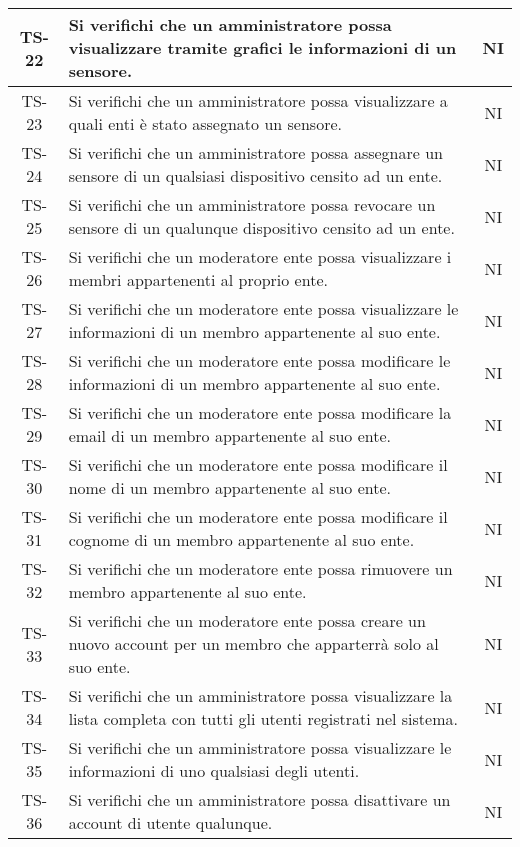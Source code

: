 \begin{center}
\begin{longtable}{|c|p{10cm}|c|}
			 \hline
			 TS-22 & Si verifichi che un amministratore possa visualizzare tramite grafici le informazioni di un sensore. & NI \\
			 \hline
			 TS-23 & Si verifichi che un amministratore possa visualizzare a quali enti è stato assegnato un sensore. & NI \\
			 \hline
			 TS-24 & Si verifichi che un amministratore possa assegnare un sensore di un qualsiasi dispositivo censito ad un ente. & NI \\
			 \hline
			 TS-25 & Si verifichi che un amministratore possa revocare un sensore di un qualunque dispositivo censito ad un ente. & NI \\
			 \hline
			 TS-26 &  Si verifichi che un moderatore ente possa visualizzare i membri appartenenti al proprio ente. & NI \\
			 \hline
			 TS-27 & Si verifichi che un moderatore ente possa visualizzare le informazioni di un membro appartenente al suo ente. & NI \\
			 \hline
			 TS-28 & Si verifichi che un moderatore ente possa modificare le informazioni di un membro appartenente al suo ente. & NI \\
			 \hline
			 TS-29 & Si verifichi che un moderatore ente possa modificare la email di un membro appartenente al suo ente. & NI \\
			 \hline
			 TS-30 & Si verifichi che un moderatore ente possa modificare il nome di un membro appartenente al suo ente. & NI \\
			 \hline
			 TS-31 & Si verifichi che un moderatore ente possa modificare il cognome di un membro appartenente al suo ente. & NI \\
			 \hline
			 TS-32 & Si verifichi che un moderatore ente possa rimuovere un membro appartenente al suo ente. & NI \\
			 \hline
			 TS-33 & Si verifichi che un moderatore ente possa creare un nuovo account per un membro che apparterrà solo al suo ente. & NI \\
			 \hline
			 TS-34 & Si verifichi che un amministratore possa visualizzare la lista completa con tutti gli utenti registrati nel sistema. & NI \\
			 \hline
			 TS-35 & Si verifichi che un amministratore possa visualizzare le informazioni di uno qualsiasi degli utenti. & NI \\
			 \hline
			 TS-36 & Si verifichi che un amministratore possa disattivare un account di utente qualunque. & NI \\

\end{longtable}
\end{center}
